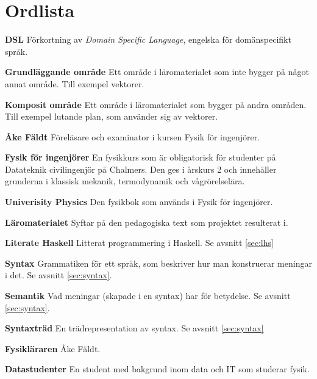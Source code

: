
\chapter*{Ordlista}


\textbf{DSL} Förkortning av \textit{Domain Specific Language}, engelska för domänspecifikt språk.

\textbf{Grundläggande område} Ett område i läromaterialet som inte bygger på något annat område. Till exempel vektorer.

\textbf{Komposit område} Ett område i läromaterialet som bygger på andra områden. Till exempel lutande plan, som använder sig av vektorer.

\textbf{Åke Fäldt} Föreläsare och examinator i kursen Fysik för ingenjörer.

\textbf{Fysik för ingenjörer} En fysikkurs som är obligatorisk för studenter på Datateknik civilingenjör på Chalmers. Den ges i årskurs 2 och innehåller grunderna i klassisk mekanik, termodynamik och vågrörelselära.

\textbf{Univerisity Physics} Den fysikbok som används i Fysik för ingenjörer.

\textbf{Läromaterialet} Syftar på den pedagogiska text som projektet resulterat i.

\textbf{Literate Haskell} Litterat programmering i Haskell. Se avsnitt \ref{sec:lhs}

\textbf{Syntax} Grammatiken för ett språk, som beskriver hur man konstruerar meningar i det. Se avsnitt \ref{sec:syntax}.

\textbf{Semantik} Vad meningar (skapade i en syntax) har för betydelse. Se avsnitt \ref{sec:syntax}.

\textbf{Syntaxträd} En trädrepresentation av syntax. Se avsnitt \ref{sec:syntax}

\textbf{Fysikläraren} Åke Fäldt.

\textbf{Datastudenter} En student med bakgrund inom data och IT som studerar fysik.
